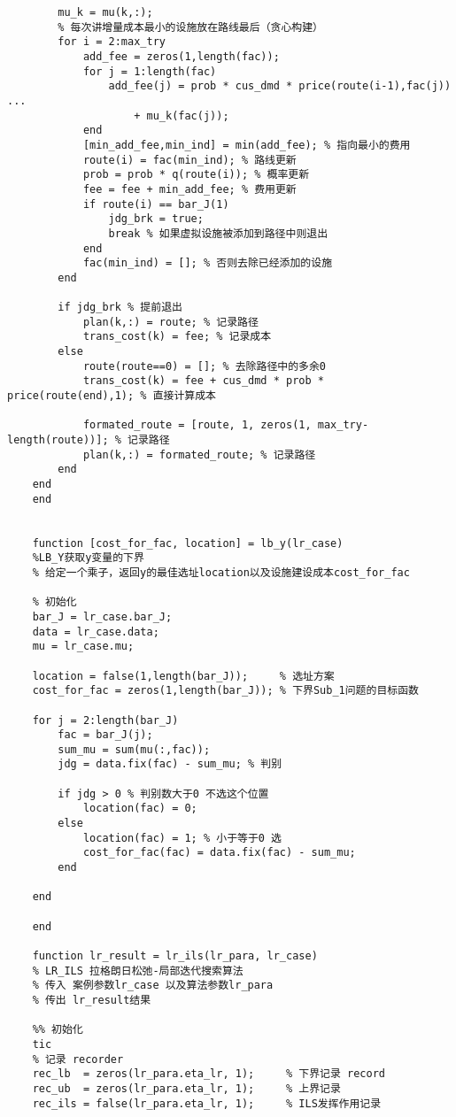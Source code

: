 {\begin{lstlisting}
        mu_k = mu(k,:);
        % 每次讲增量成本最小的设施放在路线最后（贪心构建）
        for i = 2:max_try
            add_fee = zeros(1,length(fac));
            for j = 1:length(fac)
                add_fee(j) = prob * cus_dmd * price(route(i-1),fac(j)) ...
                    + mu_k(fac(j));
            end
            [min_add_fee,min_ind] = min(add_fee); % 指向最小的费用
            route(i) = fac(min_ind); % 路线更新
            prob = prob * q(route(i)); % 概率更新
            fee = fee + min_add_fee; % 费用更新
            if route(i) == bar_J(1)
                jdg_brk = true;
                break % 如果虚拟设施被添加到路径中则退出
            end
            fac(min_ind) = []; % 否则去除已经添加的设施
        end

        if jdg_brk % 提前退出
            plan(k,:) = route; % 记录路径
            trans_cost(k) = fee; % 记录成本
        else
            route(route==0) = []; % 去除路径中的多余0
            trans_cost(k) = fee + cus_dmd * prob * price(route(end),1); % 直接计算成本

            formated_route = [route, 1, zeros(1, max_try-length(route))]; % 记录路径
            plan(k,:) = formated_route; % 记录路径
        end
    end
    end


    function [cost_for_fac, location] = lb_y(lr_case)
    %LB_Y获取y变量的下界
    % 给定一个乘子，返回y的最佳选址location以及设施建设成本cost_for_fac

    % 初始化
    bar_J = lr_case.bar_J;
    data = lr_case.data;
    mu = lr_case.mu;

    location = false(1,length(bar_J));     % 选址方案
    cost_for_fac = zeros(1,length(bar_J)); % 下界Sub_1问题的目标函数

    for j = 2:length(bar_J)
        fac = bar_J(j);
        sum_mu = sum(mu(:,fac)); 
        jdg = data.fix(fac) - sum_mu; % 判别

        if jdg > 0 % 判别数大于0 不选这个位置
            location(fac) = 0;
        else
            location(fac) = 1; % 小于等于0 选
            cost_for_fac(fac) = data.fix(fac) - sum_mu;
        end

    end

    end

    function lr_result = lr_ils(lr_para, lr_case)
    % LR_ILS 拉格朗日松弛-局部迭代搜索算法
    % 传入 案例参数lr_case 以及算法参数lr_para
    % 传出 lr_result结果

    %% 初始化
    tic
    % 记录 recorder
    rec_lb  = zeros(lr_para.eta_lr, 1);     % 下界记录 record
    rec_ub  = zeros(lr_para.eta_lr, 1);     % 上界记录
    rec_ils = false(lr_para.eta_lr, 1);     % ILS发挥作用记录


\end{lstlisting}}

